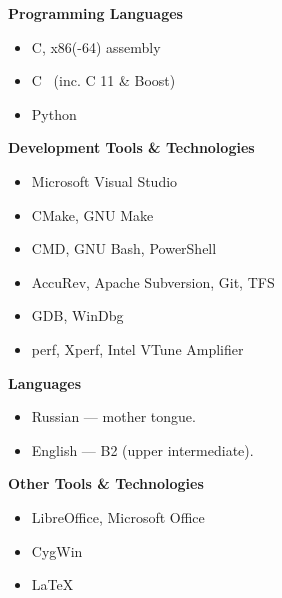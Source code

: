 \documentclass[11pt]{article}
\newcommand\CXX{%
  C\nolinebreak[4]\hspace{-.05em}\raisebox{.4ex}{\relsize{-3}{\textbf{++}}}%
}
\newcommand\CvSmallSkipLength{0.5em}
\newcommand\CvBigSkipLength{1em}
\newcommand\CvSkip[1]{\vspace{#1}}
\newcommand\CvSmallSkip{\CvSkip{\CvSmallSkipLength}}
\newcommand\CvBigSkip{\CvSkip{\CvBigSkipLength}}
\newcommand\CvSectionHeader[1]{\CvBigSkip\textbf{#1}\CvBigSkip}
\newcommand\CvRule{\begingroup\color{CvRuleColor}\hrule\endgroup}
\newcommand\CvWorkplaceHeader[5]{\begingroup%
  \CvRule
  \fboxsep0pt%
  \colorbox{CvWorkplaceHeaderColor}{%
    \begin{minipage}{\linewidth-2\fboxsep}%
\CvSmallSkip
#1 -- #2 \hfill \textit{#3} at #4 (\href{http://#5/}{#5})
\CvSmallSkip
    \end{minipage}%
  }%
  \CvRule
\endgroup}
\newenvironment{CvWorkplaceDescription}{%
    \begingroup\setlength\parskip{\CvSmallSkipLength}%
  }{%
    \CvSmallSkip\endgroup%
  }
\begin{document}



\begin{minipage}[t]{.49\linewidth}
\CvSectionHeader{Programming Languages}

\begin{itemize}
\item C, x86(-64) assembly
\item \CXX\ (inc. {\CXX}11 \& Boost)
\item Python
\end{itemize}

\CvSectionHeader{Development Tools \& Technologies}

\begin{itemize}
\item Microsoft Visual Studio
\item CMake, GNU Make
\item CMD, GNU Bash, PowerShell
\item AccuRev, Apache Subversion, Git, TFS
\item GDB, WinDbg
\item perf, Xperf, Intel VTune Amplifier
\end{itemize}
\hfill
\end{minipage}
\begin{minipage}[t]{.49\linewidth}
\CvSectionHeader{Languages}

\begin{itemize}
\item Russian --- mother tongue.
\item English --- B2 (upper intermediate).
\end{itemize}

\CvSectionHeader{Other Tools \& Technologies}

\begin{itemize}
\item LibreOffice, Microsoft Office
\item CygWin
\item \LaTeX
\end{itemize}
\end{minipage}
\end{document}

